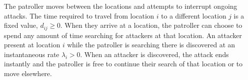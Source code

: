 \documentclass[11pt,a4paper]{article}
\begin{document}
The patroller moves between the locations and attempts to interrupt ongoing attacks.
The time required to travel from location $i$ to a different location $j$ is a fixed value, $d_{ij}\geq 0$.
When they arrive at a location, the patroller can choose to spend any amount of time searching for attackers at that location.
An attacker present at location $i$ while the patroller is searching there is discovered at an instantaneous rate $\lambda_i>0$. 
When an attacker is discovered, the attack ends instantly and the patroller is free to continue their search of that location or to move elsewhere.
\end{document}
